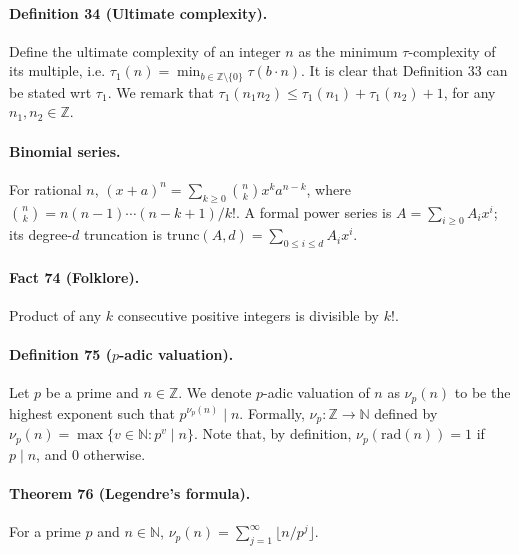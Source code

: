 \paragraph{Definition 34 (Ultimate complexity).} Define the ultimate complexity of an integer $n$ as the minimum $\tau$-complexity of its multiple, i.e. $\tau_1(n)=\min_{b\in\mathbb Z\setminus\{0\}}\tau(b\cdot n)$. It is clear that Definition 33 can be stated wrt $\tau_1$. We remark that $\tau_1(n_1n_2)\le\tau_1(n_1)+\tau_1(n_2)+1$, for any $n_1,n_2\in\mathbb Z$.
\paragraph{Binomial series.} For rational $n$, $(x+a)^n=\sum_{k\ge0}\binom nkx^ka^{n-k}$, where $\binom nk=n(n-1)\cdots(n-k+1)/k!$. A formal power series is $A=\sum_{i\ge0}A_ix^i$; its degree-$d$ truncation is $\mathrm{trunc}(A,d)=\sum_{0\le i\le d}A_ix^i$.
\paragraph{Fact 74 (Folklore).} Product of any $k$ consecutive positive integers is divisible by $k!$.
\paragraph{Definition 75 ($p$-adic valuation).} Let $p$ be a prime and $n\in\mathbb Z$. We denote $p$-adic valuation of $n$ as $\nu_p(n)$ to be the highest exponent such that $p^{\nu_p(n)}\mid n$. Formally, $\nu_p:\mathbb Z\longrightarrow\mathbb N$ defined by $\nu_p(n)=\max\{v\in\mathbb N:p^v\mid n\}$. Note that, by definition, $\nu_p(\mathrm{rad}(n))=1$ if $p\mid n$, and 0 otherwise.
\paragraph{Theorem 76 (Legendre's formula).} For a prime $p$ and $n\in\mathbb N$, $\nu_p(n)=\sum_{j=1}^\infty\lfloor n/p^j\rfloor$.
